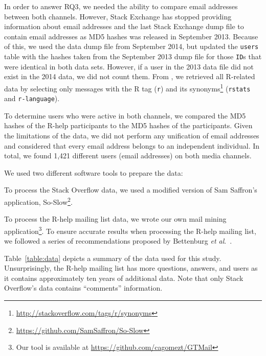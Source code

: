     
In order to answer RQ3, we needed the ability to compare email addresses between both channels. However, Stack Exchange has stopped providing information about email addresses and the last Stack Exchange dump file to contain email addresses as MD5 hashes was released in September 2013.
Because of this, we used the data dump file from September 2014, but updated the \texttt{users} table with the hashes taken from the September 2013 dump file for those \texttt{ID}s that were identical in both data sets.
However, if a user in the 2013 data file did not exist in the 2014 data, we did not count them.
From \SO, we retrieved all R-related data by selecting only messages with the R tag (\texttt{r}) and its synonyms\footnote{\url{http://stackoverflow.com/tags/r/synonyms}} (\texttt{rstats} and \texttt{r-language}).

To determine users who were active in both channels, we compared the MD5 hashes of the R-help participants to the MD5 hashes of the \SO participants. Given the limitations of the \SO data, we did not perform any unification of email addresses and considered that every email address belongs to an independent individual. In total, we found 1,421 different users (email addresses) on both media channels.


We used two different software tools to prepare the data:
    \begin{enumerate*}[label=(\arabic*)]
    \item To process the Stack Overflow data, we used a modified version of Sam Saffron's application, So-Slow\footnote{\url{https://github.com/SamSaffron/So-Slow}}.
    \item To process the R-help mailing list data, we wrote our own mail mining application\footnote{Our tool is available at
            \url{https://github.com/cagomezt/GTMail}}. To ensure accurate results when processing the R-help mailing list, we followed a series of recommendations proposed by Bettenburg \textit{et al}.~\cite{Bettenburg2009}.
    \end{enumerate*}
Table~\ref{table:data} depicts a summary of the data used for this study. Unsurprisingly, the R-help mailing list has more questions, answers, and users as it contains approximately ten years of additional data.
Note that only Stack Overflow's data contains ``comments'' information.

